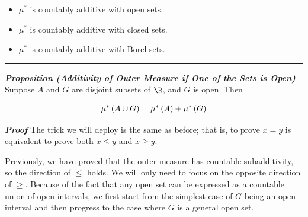\documentclass[
]{article}
\begin{document}
\begin{itemize}
\item
  \(\mu^*\) is countably additive with open sets.
\item
  \(\mu^*\) is countably additive with closed sets.
\item
  \(\mu^*\) is countably additive with Borel sets.
\end{itemize}

\begin{center}\rule{0.5\linewidth}{0.5pt}\end{center}

\emph{\textbf{Proposition (Additivity of Outer Measure if One of the
Sets is Open)}} Suppose \(A\) and \(G\) are disjoint subsets of \(\R\),
and \(G\) is open. Then

\[\mu^*\left(A\cup G\right) = \mu^*\left(A\right)+\mu^* \left(G\right)\]

\emph{\textbf{Proof}} The trick we will deploy is the same as before;
that is, to prove \(x = y\) is equivalent to prove both \(x\le y\) and
\(x\ge y\).

Previously, we have proved that the outer measure has countable
subadditivity, so the direction of \(\le\) holds. We will only need to
focus on the opposite direction of \(\ge\). Because of the fact that any
open set can be expressed as a countable union of open intervals, we
first start from the simplest case of \(G\) being an open interval and
then progress to the case where \(G\) is a general open set.
\end{document}
